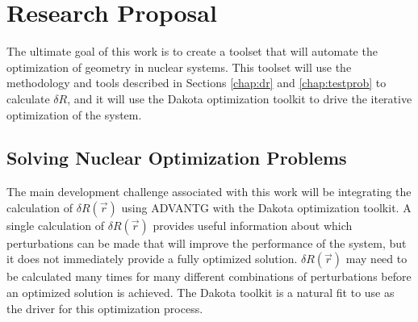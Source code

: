 \chapter{Research Proposal}
\label{chap:proposal}


The ultimate goal of this work is to create a toolset that will automate the optimization of geometry in nuclear systems.
This toolset will use the methodology and tools described in Sections \ref{chap:dr} and \ref{chap:testprob} to calculate $\delta R$, and it will use the Dakota optimization toolkit to drive the iterative optimization of the system.

\section{Solving Nuclear Optimization Problems}
\label{sec:proposal:solving_nuclear_optimization_problems}

The main development challenge associated with this work will be integrating the calculation of $\delta R\left(\vec{r}\right)$ using ADVANTG with the Dakota optimization toolkit.
A single calculation of $\delta R\left(\vec{r}\right)$ provides useful information about which perturbations can be made that will improve the performance of the system, but it does not immediately provide a fully optimized solution.
$\delta R\left(\vec{r}\right)$ may need to be calculated many times for many different combinations of perturbations before an optimized solution is achieved.
The Dakota toolkit is a natural fit to use as the driver for this optimization process.

